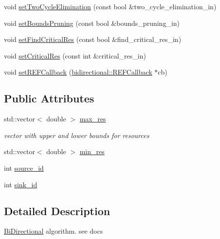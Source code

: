 \begin{DoxyCompactItemize}
void \hyperlink{classbidirectional_1_1BiDirectional_adc4255b9f2ad9c9271805a64f93ea7c9}{set\+Two\+Cycle\+Elimination} (const bool \&two\+\_\+cycle\+\_\+elimination\+\_\+in)
\item 
void \hyperlink{classbidirectional_1_1BiDirectional_ac3cb989cdc2f4c1cedde6b30a9e7c1d8}{set\+Bounds\+Pruning} (const bool \&bounds\+\_\+pruning\+\_\+in)
\item 
void \hyperlink{classbidirectional_1_1BiDirectional_ad309aa627316fbccdf1d6e747d064c05}{set\+Find\+Critical\+Res} (const bool \&find\+\_\+critical\+\_\+res\+\_\+in)
\item 
void \hyperlink{classbidirectional_1_1BiDirectional_ad0a3ef7e4a5fcabfa34f9401532258b5}{set\+Critical\+Res} (const int \&critical\+\_\+res\+\_\+in)
\item 
void \hyperlink{classbidirectional_1_1BiDirectional_a901d84e260c2d18c3a3f2d14a5492278}{set\+R\+E\+F\+Callback} (\hyperlink{classbidirectional_1_1REFCallback}{bidirectional\+::\+R\+E\+F\+Callback} $\ast$cb)
\end{DoxyCompactItemize}
\subsection*{Public Attributes}
\begin{DoxyCompactItemize}
\item 
std\+::vector$<$ double $>$ \hyperlink{classbidirectional_1_1BiDirectional_af181d7ebb76e773b7aa5da0da40cc74d}{max\+\_\+res}
\begin{DoxyCompactList}\small\item\em vector with upper and lower bounds for resources \end{DoxyCompactList}\item 
std\+::vector$<$ double $>$ \hyperlink{classbidirectional_1_1BiDirectional_af144538113c466b21e18a128f1ffb18e}{min\+\_\+res}
\item 
int \hyperlink{classbidirectional_1_1BiDirectional_ae8256189cc23d7033a5e8e36ac36ec4a}{source\+\_\+id}
\item 
int \hyperlink{classbidirectional_1_1BiDirectional_a742976c94bdf77c2bfae680ffd2e468d}{sink\+\_\+id}
\end{DoxyCompactItemize}


\subsection{Detailed Description}
\hyperlink{classbidirectional_1_1BiDirectional}{Bi\+Directional} algorithm. see docs


